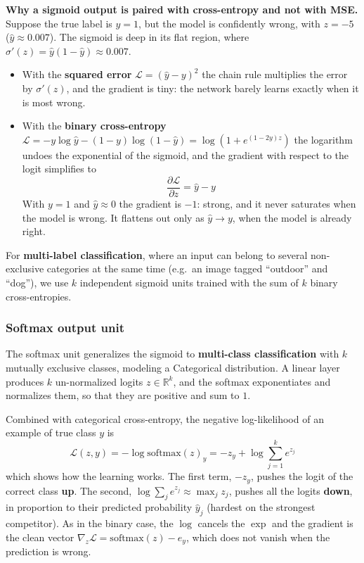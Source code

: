 \begin{note}
    \textbf{Why a sigmoid output is paired with cross-entropy and not with MSE.}
    Suppose the true label is $y = 1$, but the model is confidently wrong, with
    $z = -5$ ($\hat{y} \approx 0.007$). The sigmoid is deep in its flat region,
    where $\sigma'(z) = \hat{y}(1 - \hat{y}) \approx 0.007$.
    \begin{itemize}
        \item With the \textbf{squared error} $\mathcal{L} = (\hat{y} - y)^2$ the
              chain rule multiplies the error by $\sigma'(z)$, and the gradient is
              tiny: the network barely learns exactly when it is most wrong.
        \item With the \textbf{binary cross-entropy}
              $\mathcal{L} = -y\log\hat{y} - (1-y)\log(1-\hat{y}) = \log(1 + e^{(1-2y)z})$
              the logarithm undoes the exponential of the sigmoid, and the gradient
              with respect to the logit simplifies to
              \begin{equation*}
                  \frac{\partial \mathcal{L}}{\partial z} = \hat{y} - y
              \end{equation*}
              With $y = 1$ and $\hat{y} \approx 0$ the gradient is $-1$: strong, and
              it never saturates when the model is wrong. It flattens out only as
              $\hat{y} \to y$, when the model is already right.
    \end{itemize}
\end{note}

For \textbf{multi-label classification}, where an input can belong to several
non-exclusive categories at the same time (e.g.\ an image tagged ``outdoor'' and
``dog''), we use $k$ independent sigmoid units trained with the sum of $k$ binary
cross-entropies.

\subsubsection{Softmax output unit}
The softmax unit generalizes the sigmoid to \textbf{multi-class classification}
with $k$ mutually exclusive classes, modeling a Categorical distribution. A linear
layer produces $k$ un-normalized logits $z \in \mathbb{R}^k$, and the softmax
exponentiates and normalizes them, so that they are positive and sum to $1$.

Combined with categorical cross-entropy, the negative log-likelihood of an example
of true class $y$ is
\begin{equation}
    \mathcal{L}(z, y) = -\log \text{softmax}(z)_y = -z_y + \log \sum_{j=1}^k e^{z_j}
\end{equation}
which shows how the learning works. The first term, $-z_y$, pushes the logit of the
correct class \textbf{up}. The second, $\log \sum_j e^{z_j} \approx \max_j z_j$,
pushes all the logits \textbf{down}, in proportion to their predicted probability
$\hat{y}_j$ (hardest on the strongest competitor). As in the binary case, the $\log$
cancels the $\exp$ and the gradient is the clean vector
$\nabla_z \mathcal{L} = \text{softmax}(z) - e_y$, which does not vanish when the
prediction is wrong.

